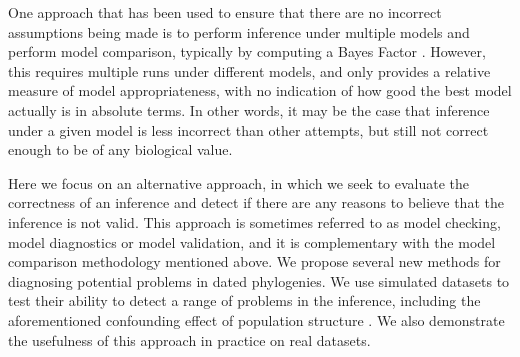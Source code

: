 \documentclass{article}
\begin{document}
One approach that has been used to ensure that there are no incorrect assumptions being made 
is to perform inference under multiple models and perform model comparison,
typically by computing a Bayes Factor \citep{Baele2012,Li2012,bouckaertBModelTestBayesianPhylogenetic2017}. 
However, this requires multiple runs under different models, and only provides a relative measure
of model appropriateness, with no indication of how good the best model actually is in absolute terms.
In other words, it may be the case that inference under a given model is less incorrect than other attempts,
but still not correct enough to be of any biological value. 

Here we focus on an alternative approach, in which we seek to evaluate
the correctness of an inference and detect if there are any reasons to believe that the inference is not valid.
This approach is sometimes referred to as model checking, model diagnostics or model validation, 
and it is complementary with the model comparison methodology mentioned above. 
We propose several new methods for diagnosing potential problems in dated phylogenies.
We use simulated datasets to test their ability to detect a range of problems
in the inference, including the aforementioned confounding effect of population structure
\citep{Murray2016}. 
We also demonstrate the usefulness of this approach in practice on real datasets.
\end{document}
